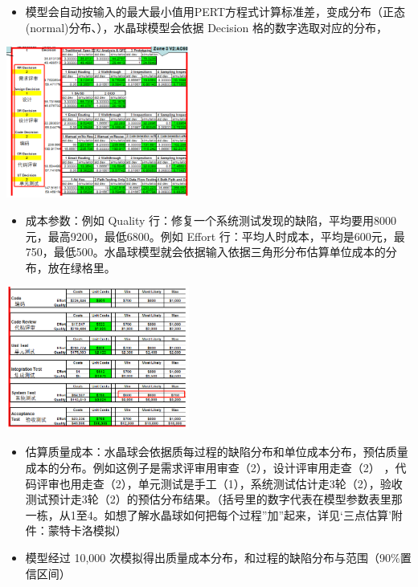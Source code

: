 \begin{itemize}
\tightlist
\item
  模型会自动按输入的最大最小值用PERT方程式计算标准差，变成分布（正态(normal)分布、），水晶球模型会依据 Decision 格的数字选取对应的分布，

\end{itemize}

\includegraphics[width=6cm]{微信截图_20231027140307.png}

\begin{itemize}
\tightlist
\item
  成本参数：例如 Quality 行：修复一个系统测试发现的缺陷，平均要用8000元，最高9200，最低6800。例如 Effort 行：平均人时成本，平均是600元，最750，最低500。水晶球模型就会依据输入依据三角形分布估算单位成本的分布，放在绿格里。
\end{itemize}

\includegraphics[width=6cm]{微信截图_20231027140341.png}

\begin{itemize}
\tightlist
\item
  估算质量成本：水晶球会依据质每过程的缺陷分布和单位成本分布，预估质量成本的分布。例如这例子是需求评审用审查（2），设计评审用走查（2） ，代码评审也用走查（2），单元测试是手工（1），系统测试估计走3轮（2），验收测试预计走3轮（2）的预估分布结果。（括号里的数字代表在模型参数表里那一栋，从1至4。如想了解水晶球如何把每个过程”加”起来，详见‘三点估算’附件：蒙特卡洛模拟）
\end{itemize}

\begin{itemize}
\tightlist
\item
  模型经过 10,000 次模拟得出质量成本分布，和过程的缺陷分布与范围（90\%置信区间）
\end{itemize}

